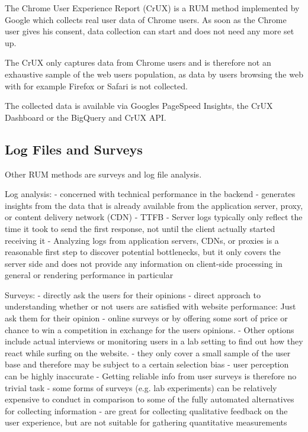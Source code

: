 The Chrome User Experience Report (CrUX) is a RUM method implemented by Google which collects real user data of Chrome users.
As soon as the Chrome user gives his consent, data collection can start and does not need any more set up.

The CrUX only captures data from Chrome users and is therefore not an exhaustive sample of the web users population, as data by users browsing the web with for example Firefox or Safari is not collected.

The collected data is available via Googles PageSpeed Insights, the CrUX Dashboard or the BigQuery and CrUX API. %








\subsection{Log Files and Surveys}

Other RUM methods are surveys and log file analysis.



Log analysis:
- concerned with technical performance in the backend
- generates insights from the data that is already available from the application server, proxy, or content delivery network (CDN)
- TTFB
- Server logs typically only reflect the time it took to send the first response, not until the client actually started receiving it
- Analyzing logs from application servers, CDNs, or proxies is a reasonable first step to discover potential bottlenecks, but it only covers the server side and does not provide any information on client-side processing in general or rendering performance in particular


Surveys:
- directly ask the users for their opinions
- direct approach to understanding whether or not users are satisfied with website performance: Just ask them for their opinion
- online surveys or by offering some sort of price or chance to win a competition in exchange for the users opinions. 
- Other options include actual interviews or monitoring users in a lab setting to find out how they react while surfing on the website.
- they only cover a small sample of the user base and therefore may be subject to a certain selection bias
- user perception can be highly inaccurate
- Getting reliable info from user surveys is therefore no trivial task
- some forms of surveys (e.g. lab experiments) can be relatively expensive to conduct in comparison to some of the fully automated alternatives for collecting information
- are great for collecting qualitative feedback on the user experience, but are not suitable for gathering quantitative measurements




